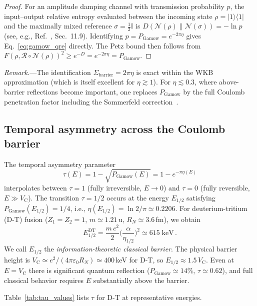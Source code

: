 \documentclass[prc,twocolumn,superscriptaddress,longbibliography,floatfix]{revtex4-2}
\newcommand{\Petz}{\mathcal{R}}
\newcommand{\chan}{\mathcal{N}}
\newcommand{\op}[2]{|#1\rangle\langle#2|}
\newcommand{\tauasym}{\tau}
\newcommand{\PGam}{P_{\mathrm{Gamow}}}
\newcommand{\Sbar}{\Sigma_{\mathrm{barrier}}}
\newcommand{\VC}{V_{\mathrm{C}}}
\begin{document}
\begin{proof}
For an amplitude damping channel with transmission probability $p$,
the input--output relative entropy evaluated between the incoming state
$\rho = \op{1}{1}$ and the maximally mixed reference
$\sigma = \tfrac{1}{2}\mathbb{I}$ is
$D(\chan(\rho)\|\chan(\sigma)) = -\ln p$ (see, e.g.,
Ref.~\cite{Wilde2017}, Sec.~11.9).
Identifying $p = \PGam = e^{-2\pi\eta}$
gives Eq.~\eqref{eq:gamow_qre} directly.
The Petz bound then follows from
$F(\rho,\Petz\circ\chan(\rho))^{2}\geq e^{-D} = e^{-2\pi\eta}=\PGam$.
\end{proof}

\noindent\textit{Remark.}---The identification
$\Sbar = 2\pi\eta$ is exact within the WKB approximation (which is
itself excellent for $\eta \gtrsim 1$).  For $\eta \lesssim 0.3$, where
above-barrier reflections become important, one replaces $\PGam$ by the
full Coulomb penetration factor including the Sommerfeld
correction~\cite{Breit1959}.

\subsection{Temporal asymmetry across the Coulomb barrier}

The temporal asymmetry parameter~\cite{Huang2026}
\begin{equation}
\tauasym(E) = 1 - \sqrt{\PGam(E)} = 1 - e^{-\pi\eta(E)}
\label{eq:tau_def}
\end{equation}
interpolates between $\tauasym = 1$ (fully irreversible, $E \to 0$) and
$\tauasym = 0$ (fully reversible, $E \gg \VC$).  The transition
$\tauasym = 1/2$ occurs at the energy $E_{1/2}$ satisfying
$\PGam(E_{1/2}) = 1/4$, i.e., $\eta(E_{1/2}) = \ln 2/\pi \simeq 0.2206$.
For deuterium-tritium (D-T) fusion ($Z_1 = Z_2 = 1$,
$m \simeq 1.21\,$u, $R_{N}\simeq 3.6\,$fm), we obtain
\begin{equation}
E_{1/2}^{\mathrm{DT}}
= \frac{m\,c^{2}}{2}\biggl(\frac{\alpha}{\eta_{1/2}}\biggr)^{\!2}
\simeq 615\;\mathrm{keV}\,.
\label{eq:E_half}
\end{equation}
We call $E_{1/2}$ the \emph{information-theoretic classical barrier}.
The physical barrier height is
$\VC \simeq e^{2}/(4\pi\varepsilon_{0}R_{N})\simeq 400\,$keV for D-T,
so $E_{1/2} \approx 1.5\,\VC$.
Even at $E=\VC$ there
is significant quantum reflection ($\PGam \simeq 14\%$,
$\tauasym \simeq 0.62$), and full classical behavior requires $E$
substantially above the barrier.

Table~\ref{tab:tau_values} lists $\tauasym$ for D-T at representative
energies.
\end{document}
